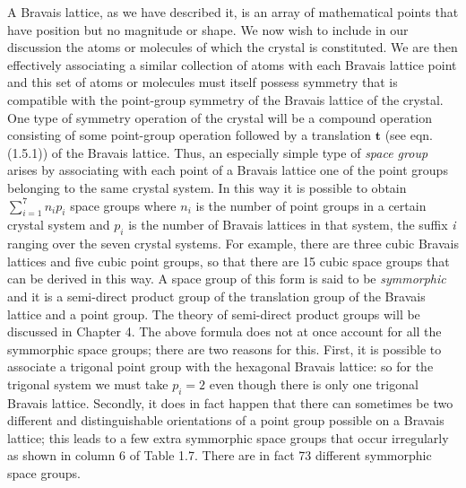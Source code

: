 \documentclass[11pt,a4paper,twoside,openright]{book}
\begin{document}
A Bravais lattice, as we have described it, is an array of mathematical points that have position but no magnitude or shape. We now wish to include in our discussion the atoms or molecules of which the crystal is constituted. We are then effectively associating a similar collection of atoms with each Bravais lattice point and this set of atoms or molecules must itself possess symmetry that is compatible with the point-group symmetry of the Bravais lattice of the crystal. One type of symmetry operation of the crystal will be a compound operation consisting of some point-group operation followed by a translation $\mathbf{t}$ (see eqn. (1.5.1)) of the Bravais lattice. Thus, an especially simple type of \textit{space group} arises by associating with each point of a Bravais lattice one of the point groups belonging to the same crystal system. In this way it is possible to obtain $\sum_{i=1}^{7} n_{i}p_{i}$ space groups where $n_{i}$ is the number of point groups in a certain crystal system and $p_{i}$ is the number of Bravais lattices in that system, the suffix \textit{i} ranging over the seven crystal systems. For example, there are three cubic Bravais lattices and five cubic point groups, so that there are 15 cubic space groups that can be derived in this way. A space group of this form is said to be \textit{symmorphic} and it is a semi-direct product group of the translation group of the Bravais lattice and a point group. The theory of semi-direct product groups will be discussed in Chapter 4. The above formula does not at once account for all the symmorphic space groups; there are two reasons for this. First, it is possible to associate a trigonal point group with the hexagonal Bravais lattice: so for the trigonal system we must take $p_{i} = 2$ even though there is only one trigonal Bravais lattice. Secondly, it does in fact happen that there can sometimes be two different and distinguishable orientations of a point group possible on a Bravais lattice; this leads to a few extra symmorphic space groups that occur irregularly as shown in column 6 of Table 1.7. There are in fact 73 different symmorphic space groups.
\end{document}
